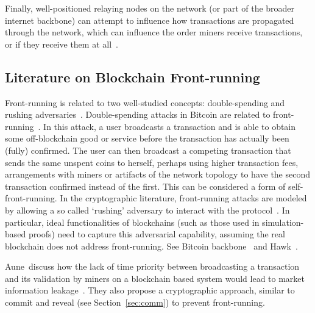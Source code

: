 Finally, well-positioned relaying nodes on the network (or part of the broader internet backbone) can attempt to influence how transactions are propagated through the network, which can influence the order miners receive transactions, or if they receive them at all~\cite{HKZG15,MGH18}.

\subsection{Literature on Blockchain Front-running}




Front-running is related to two well-studied concepts: double-spending and rushing adversaries~\cite{kosba2016hawk}. Double-spending attacks in Bitcoin are related to front-running~\cite{bamert2013have,karame2012double}. In this attack, a user broadcasts a transaction and is able to obtain some off-blockchain good or service before the transaction has actually been (fully) confirmed. The user can then broadcast a competing transaction that sends the same unspent coins to herself, perhaps using higher transaction fees, arrangements with miners or artifacts of the network topology to have the second transaction confirmed instead of the first. This can be considered a form of \textsf{self-front-running}.
In the cryptographic literature, front-running attacks are modeled by allowing a so called `rushing' adversary to interact with the protocol~\cite{beaver1992cryptographic}. In particular, ideal functionalities of blockchains (such as those used in simulation-based proofs) need to capture this adversarial capability, assuming the real blockchain does not address front-running. See \eg Bitcoin backbone~\cite{garay2015bitcoin} and Hawk~\cite{kosba2016hawk}.

Aune~\etal discuss how the lack of time priority between broadcasting a transaction and its validation by miners on a blockchain based system would lead to market information leakage~\cite{aune2017footprints}. They also propose a cryptographic approach, similar to commit and reveal (see Section~\ref{sec:comm}) to prevent front-running.

